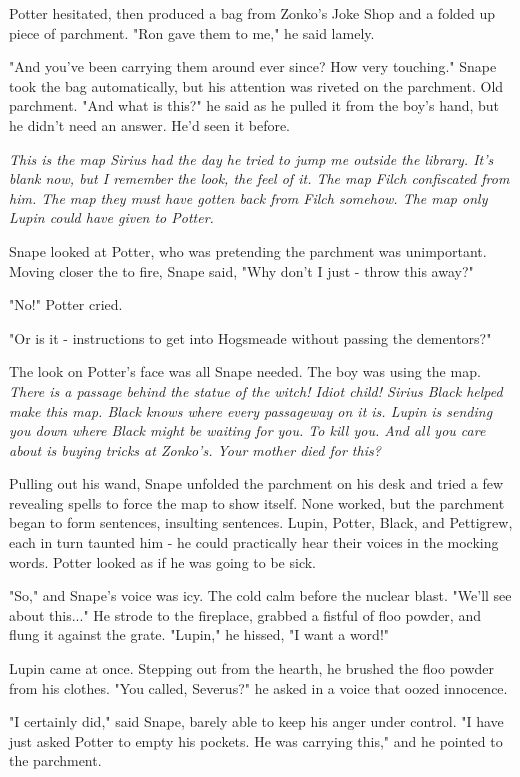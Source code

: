 \documentclass[a4paper,11pt]{article}
\begin{document}
Potter hesitated, then produced a bag from Zonko's Joke Shop and a folded up piece of parchment. "Ron gave them to me," he said lamely.

"And you've been carrying them around ever since? How very touching." Snape took the bag automatically, but his attention was riveted on the parchment. Old parchment. "And what is this?" he said as he pulled it from the boy's hand, but he didn't need an answer. He'd seen it before.

\emph{This is the map Sirius had the day he tried to jump me outside the library. It's blank now, but I remember the look, the feel of it. The map Filch confiscated from him. The map they must have gotten back from Filch somehow. The map only Lupin could have given to Potter.}

Snape looked at Potter, who was pretending the parchment was unimportant. Moving closer the to fire, Snape said, "Why don't I just - throw this away?"

"No!" Potter cried.

"Or is it - instructions to get into Hogsmeade without passing the dementors?"

The look on Potter's face was all Snape needed. The boy was using the map. \emph{There is a passage behind the statue of the witch! Idiot child! Sirius Black helped make this map. Black knows where every passageway on it is. Lupin is sending you down where Black might be waiting for you. To kill you. And all you care about is buying tricks at Zonko's. Your mother died for this?}

Pulling out his wand, Snape unfolded the parchment on his desk and tried a few revealing spells to force the map to show itself. None worked, but the parchment began to form sentences, insulting sentences. Lupin, Potter, Black, and Pettigrew, each in turn taunted him - he could practically hear their voices in the mocking words. Potter looked as if he was going to be sick.

"So," and Snape's voice was icy. The cold calm before the nuclear blast. "We'll see about this..." He strode to the fireplace, grabbed a fistful of floo powder, and flung it against the grate. "Lupin," he hissed, "I want a word!"

Lupin came at once. Stepping out from the hearth, he brushed the floo powder from his clothes. "You called, Severus?" he asked in a voice that oozed innocence.

"I certainly did," said Snape, barely able to keep his anger under control. "I have just asked Potter to empty his pockets. He was carrying this," and he pointed to the parchment.
\end{document}
